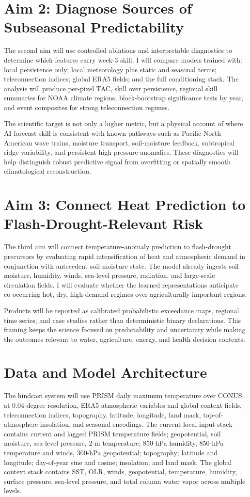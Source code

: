 \documentclass[11pt,letterpaper]{article}
\begin{document}
\section*{Aim 2: Diagnose Sources of Subseasonal Predictability}
The second aim will use controlled ablations and interpretable diagnostics to determine which features carry week-3 skill. I will compare models trained with: local persistence only; local meteorology plus static and seasonal terms; teleconnection indices; global ERA5 fields; and the full conditioning stack. The analysis will produce per-pixel TAC, skill over persistence, regional skill summaries for NOAA climate regions, block-bootstrap significance tests by year, and event composites for strong teleconnection regimes.

The scientific target is not only a higher metric, but a physical account of where AI forecast skill is consistent with known pathways such as Pacific-North American wave trains, moisture transport, soil-moisture feedback, subtropical ridge variability, and persistent high-pressure anomalies. These diagnostics will help distinguish robust predictive signal from overfitting or spatially smooth climatological reconstruction.

\section*{Aim 3: Connect Heat Prediction to Flash-Drought-Relevant Risk}
The third aim will connect temperature-anomaly prediction to flash-drought precursors by evaluating rapid intensification of heat and atmospheric demand in conjunction with antecedent soil-moisture state. The model already ingests soil moisture, humidity, winds, sea-level pressure, radiation, and large-scale circulation fields. I will evaluate whether the learned representations anticipate co-occurring hot, dry, high-demand regimes over agriculturally important regions.

Products will be reported as calibrated probabilistic exceedance maps, regional time series, and case studies rather than deterministic binary declarations. This framing keeps the science focused on predictability and uncertainty while making the outcomes relevant to water, agriculture, energy, and health decision contexts.

\section*{Data and Model Architecture}
The hindcast system will use PRISM daily maximum temperature over CONUS at 0.04-degree resolution, ERA5 atmospheric variables and global context fields, teleconnection indices, topography, latitude, longitude, land mask, top-of-atmosphere insolation, and seasonal encodings. The current local input stack contains current and lagged PRISM temperature fields; geopotential, soil moisture, sea-level pressure, 2-m temperature, 850-hPa humidity, 850-hPa temperature and winds, 300-hPa geopotential; topography; latitude and longitude; day-of-year sine and cosine; insolation; and land mask. The global context stack contains SST, OLR, winds, geopotential, temperature, humidity, surface pressure, sea-level pressure, and total column water vapor across multiple levels.
\end{document}
